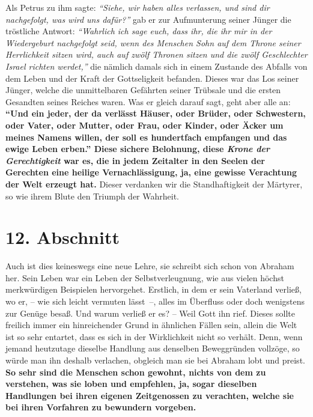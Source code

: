 Als Petrus zu ihm sagte:
\textit{"`Siehe, wir haben alles verlassen, und sind dir
nachgefolgt, was wird uns dafür?"'}
gab er zur Aufmunterung seiner Jünger die tröstliche Antwort:
\textit{"`Wahrlich ich sage euch, dass ihr, die ihr mir in der
Wiedergeburt nachgefolgt seid, wenn des Menschen Sohn auf dem Throne seiner
Herrlichkeit sitzen wird, auch auf zwölf Thronen sitzen und die zwölf
Geschlechter Israel richten werdet,"'}
die nämlich
damals sich in einem Zustande des Abfalls von dem Leben und der Kraft der
Gottseligkeit befanden. Dieses war das Los seiner Jünger, welche die
unmittelbaren Gefährten seiner Trübsale und die ersten Gesandten seines
Reiches waren. Was er gleich darauf sagt, geht aber alle an:
\textbf{ "`Und ein
jeder, der da verlässt Häuser, oder Brüder, oder Schwestern, oder Vater, oder
Mutter, oder Frau, oder Kinder, oder Äcker um meines Namens willen, der
soll es hundertfach empfangen und das ewige Leben erben."'
Diese sichere Belohnung, diese
\textit{Krone der Gerechtigkeit}
war es, die in jedem Zeitalter in den Seelen der Gerechten
eine heilige Vernachlässigung, ja, eine gewisse Verachtung der Welt erzeugt
hat.} Dieser verdanken wir die Standhaftigkeit der Märtyrer,
so wie ihrem
Blute den Triumph der Wahrheit.
\label{ref:04_10_pilger_ende}

\section{12. Abschnitt} \label{kap4_ab12}

Auch ist dies keineswegs eine neue Lehre, sie schreibt sich schon von
Abraham her. Sein Leben war ein Leben der
Selbstverleugnung, wie aus vielen
höchst merkwürdigen Beispielen hervorgehet. Erstlich, in dem er sein Vaterland
verließ, wo er, -- wie sich leicht vermuten lässt~--, alles im Überfluss oder
doch wenigstens zur Genüge besaß. Und warum verließ er es? -- Weil Gott ihn
rief. Dieses sollte freilich immer ein hinreichender Grund in ähnlichen Fällen
sein, allein die Welt ist so sehr entartet, dass es sich in der Wirklichkeit
nicht so verhält. Denn, wenn jemand heutzutage dieselbe Handlung aus denselben
Beweggründen vollzöge, so würde man ihn deshalb verlachen, obgleich man sie bei
Abraham lobt und preist.
\label{ref:04_12_tugend}
\textbf{So sehr sind die Menschen schon gewohnt, nichts von
dem zu verstehen, was sie loben und empfehlen, ja, sogar dieselben Handlungen
bei ihren eigenen Zeitgenossen zu verachten, welche sie bei ihren Vorfahren zu
bewundern vorgeben.}

